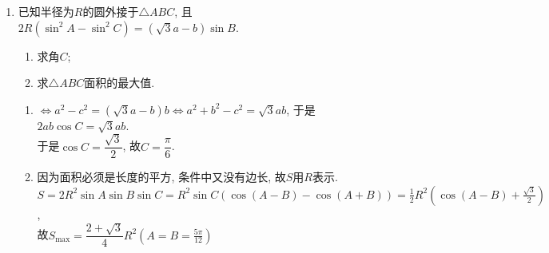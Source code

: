 \begin{enumerate}
\begin{jieda}
    $\therefore \sin C-2 \sin (A+C)+2 \sin A \cos C=0$
    
    $\therefore \sin C-2 \sin A \cos C-2 \sin C \cos A+2 \sin A \cos C=0$
    
    $\therefore \sin C-2 \sin C \cos A=0, \because \sin C>0, \therefore \cos A=\dfrac{1}{2}, A \in(0, \pi)$ ，
    
    $\therefore A=\dfrac{\pi}{3}$ ，设该三角形外接圆的半径为 $r$，由正弦定理得$\dfrac{a}{\sin A}=\dfrac{\sqrt{3}}{\dfrac{\sqrt{3}}{2}}=2=2 r, \therefore r=1$
    \end{jieda}
    \item 已知半径为$R$的圆外接于$\triangle{ABC}$, 且$2R(\sin^2A-\sin^2C)=(\sqrt{3}a-b)\sin{B}$. 
    \begin{enumerate}
    \item 求角$C$; 
    \item 求$\triangle{ABC}$面积的最大值. 
    \end{enumerate}
    \begin{jieda}
        \begin{enumerate}
        \item $\iff a^2-c^2=(\sqrt{3}a-b)b\iff a^2+b^2-c^2=\sqrt{3}ab$, 于是$2ab\cos{C}=\sqrt{3}ab$. \\
        于是$\cos{C}=\dfrac{\sqrt{3}}{2}$, 故$C=\dfrac{\pi}{6}$. 
        
        \item 因为面积必须是长度的平方, 条件中又没有边长, 故$S$用$R$表示. \\
        $S=2R^2\sin{A}\sin{B}\sin{C}=R^2\sin{C}(\cos(A-B)-\cos(A+B))=\frac{1}{2}R^2(\cos(A-B)+\frac{\sqrt{3}}{2})$, \\
        故$S_{\max}=\dfrac{2+\sqrt{3}}{4}R^2(A=B=\frac{5\pi}{12})$
        \end{enumerate}
    \end{jieda}


\end{enumerate}
